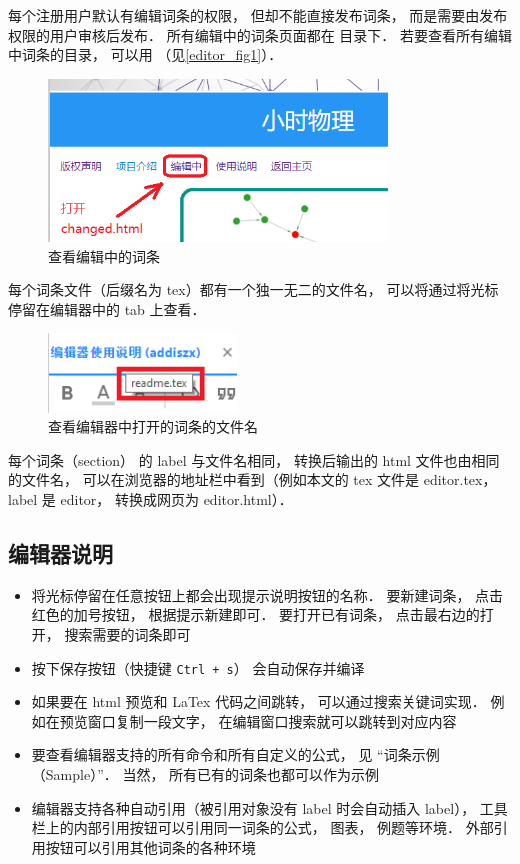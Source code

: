每个注册用户默认有编辑词条的权限， 但却不能直接发布词条， 而是需要由发布权限的用户审核后发布． 所有编辑中的词条页面都在  目录下． 若要查看所有编辑中词条的目录， 可以用 （见\autoref{editor_fig1}）．

\begin{figure}[ht]
\centering
\includegraphics[width=9cm]{./figures/editor1.png}
\caption{查看编辑中的词条} \label{editor_fig1}
\end{figure}

每个词条文件（后缀名为 tex）都有一个独一无二的文件名， 可以将通过将光标停留在编辑器中的 tab 上查看．

\begin{figure}[ht]
\centering
\includegraphics[width=5cm]{./figures/editor2.png}
\caption{查看编辑器中打开的词条的文件名} \label{editor_fig2}
\end{figure}

每个词条（section） 的 label 与文件名相同， 转换后输出的 html 文件也由相同的文件名， 可以在浏览器的地址栏中看到（例如本文的 tex 文件是 editor.tex， label 是 editor， 转换成网页为 editor.html）．

\subsection{编辑器说明}
\begin{itemize}
\item 将光标停留在任意按钮上都会出现提示说明按钮的名称． 要新建词条， 点击红色的加号按钮， 根据提示新建即可． 要打开已有词条， 点击最右边的打开， 搜索需要的词条即可

\item 按下保存按钮（快捷键 \lstinline|Ctrl + s|） 会自动保存并编译

\item 如果要在 html 预览和 LaTex 代码之间跳转， 可以通过搜索关键词实现． 例如在预览窗口复制一段文字， 在编辑窗口搜索就可以跳转到对应内容

\item 要查看编辑器支持的所有命令和所有自定义的公式， 见 “词条示例（Sample）”． 当然， 所有已有的词条也都可以作为示例

\item 编辑器支持各种自动引用（被引用对象没有 label 时会自动插入 label）， 工具栏上的内部引用按钮可以引用同一词条的公式， 图表， 例题等环境． 外部引用按钮可以引用其他词条的各种环境
\end{itemize}

